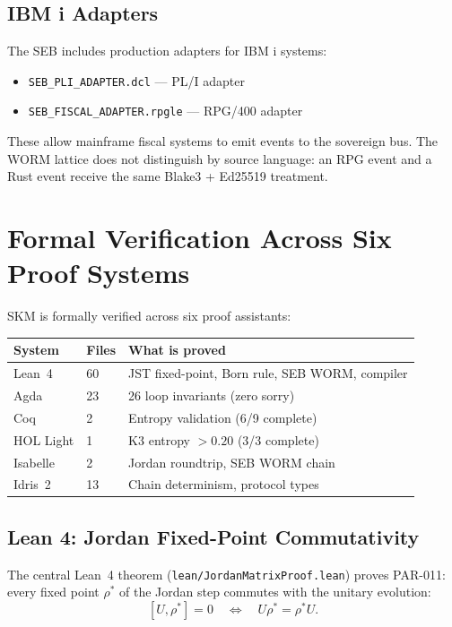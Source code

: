 \documentclass[11pt,a4paper]{article}
\begin{document}
\subsection{IBM i Adapters}

The SEB includes production adapters for IBM i systems:
\begin{itemize}[noitemsep]
\item \texttt{SEB\_PLI\_ADAPTER.dcl} --- PL/I adapter
\item \texttt{SEB\_FISCAL\_ADAPTER.rpgle} --- RPG/400 adapter
\end{itemize}

These allow mainframe fiscal systems to emit events to the sovereign
bus. The WORM lattice does not distinguish by source language: an RPG
event and a Rust event receive the same Blake3 + Ed25519 treatment.

\section{Formal Verification Across Six Proof Systems}

SKM is formally verified across six proof assistants:

\begin{center}
\begin{tabular}{lll}
\toprule
\textbf{System} & \textbf{Files} & \textbf{What is proved} \\
\midrule
Lean~4 & 60 & JST fixed-point, Born rule, SEB WORM, compiler \\
Agda & 23 & 26 loop invariants (zero sorry) \\
Coq & 2 & Entropy validation (6/9 complete) \\
HOL Light & 1 & K3 entropy $> 0.20$ (3/3 complete) \\
Isabelle & 2 & Jordan roundtrip, SEB WORM chain \\
Idris~2 & 13 & Chain determinism, protocol types \\
\bottomrule
\end{tabular}
\end{center}

\subsection{Lean 4: Jordan Fixed-Point Commutativity}

The central Lean~4 theorem (\texttt{lean/JordanMatrixProof.lean}) proves
PAR-011: every fixed point $\rho^*$ of the Jordan step commutes with
the unitary evolution:
\[
[U, \rho^*] = 0 \quad \Leftrightarrow \quad U\rho^* = \rho^* U.
\]
\end{document}
